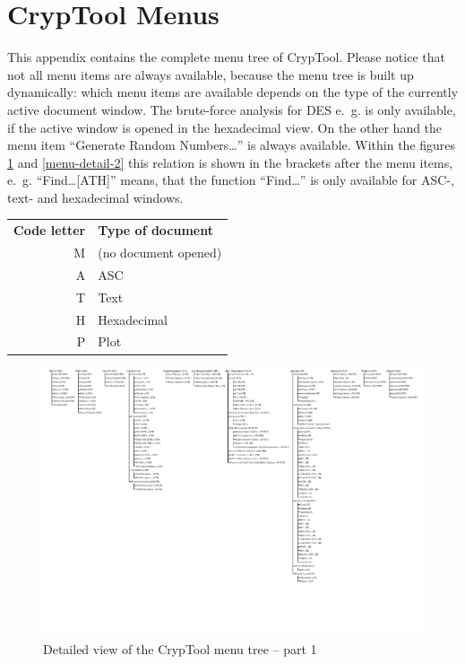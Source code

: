 
\pagebreak
\enlargethispage{1cm}
\section{CrypTool Menus}
\hypertarget{appendix-menutree}{}\label{s:appendix-menutree}
This appendix contains the complete menu tree of CrypTool. 
Please notice that not all menu items are always available, because the
menu tree is built up dynamically: which menu items are available depends
on the type of the currently active document window.
The brute-force analysis for DES e.~g. is only available, if the active
window is opened in the hexadecimal view. On the other hand the menu item
``Generate Random Numbers\dots'' is always available. 
Within the figures \ref{menu-detail-1} and \ref{menu-detail-2} 
this relation is shown in the brackets after the menu items,
e.~g. ``Find\dots[ATH]'' means, that the function ``Find\dots'' is only
available for ASC-, text- and hexadecimal windows.
\begin{center}
\begin{tabular}{rl}
\bf Code letter & \bf Type of document \\
M & (no document opened)\\
A & ASC\\
T & Text\\
H & Hexadecimal\\
P & Plot\\
\end{tabular}
\end{center}

\nobreak

\begin{figure}[!hb]
\begin{center}
\includegraphics[scale=1.1, clip, viewport=0 300 404 591]{figures/cryptool-menu-detail-en}
\caption{Detailed view of the CrypTool menu tree -- part 1}
\label{menu-detail-1}
\end{center}
\end{figure}

